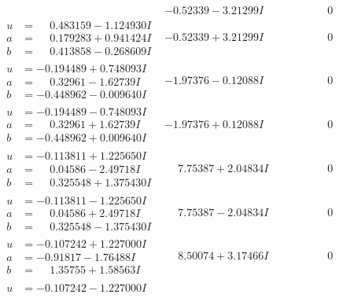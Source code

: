 \documentclass[1p]{elsarticle_modified}
\theoremstyle{definition}
\begin{document}
$$\begin{array}{c|c|c}
 & -0.52339 - 3.21299 I & \phantom{-0.000000 } 0 \\ \hline\begin{aligned}
u &= \phantom{-}0.483159 - 1.124930 I \\
a &= \phantom{-}0.179283 + 0.941424 I \\
b &= \phantom{-}0.413858 - 0.268609 I\end{aligned}
 & -0.52339 + 3.21299 I & \phantom{-0.000000 } 0 \\ \hline\begin{aligned}
u &= -0.194489 + 0.748093 I \\
a &= \phantom{-}0.32961 - 1.62739 I \\
b &= -0.448962 - 0.009640 I\end{aligned}
 & -1.97376 - 0.12088 I & \phantom{-0.000000 } 0 \\ \hline\begin{aligned}
u &= -0.194489 - 0.748093 I \\
a &= \phantom{-}0.32961 + 1.62739 I \\
b &= -0.448962 + 0.009640 I\end{aligned}
 & -1.97376 + 0.12088 I & \phantom{-0.000000 } 0 \\ \hline\begin{aligned}
u &= -0.113811 + 1.225650 I \\
a &= \phantom{-}0.04586 - 2.49718 I \\
b &= \phantom{-}0.325548 + 1.375430 I\end{aligned}
 & \phantom{-}7.75387 + 2.04834 I & \phantom{-0.000000 } 0 \\ \hline\begin{aligned}
u &= -0.113811 - 1.225650 I \\
a &= \phantom{-}0.04586 + 2.49718 I \\
b &= \phantom{-}0.325548 - 1.375430 I\end{aligned}
 & \phantom{-}7.75387 - 2.04834 I & \phantom{-0.000000 } 0 \\ \hline\begin{aligned}
u &= -0.107242 + 1.227000 I \\
a &= -0.91817 - 1.76488 I \\
b &= \phantom{-}1.35755 + 1.58563 I\end{aligned}
 & \phantom{-}8.50074 + 3.17466 I & \phantom{-0.000000 } 0 \\ \hline\begin{aligned}
u &= -0.107242 - 1.227000 I \\

\end{aligned}
\end{array}$$
\end{document}
